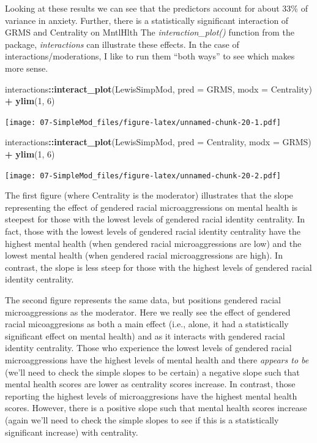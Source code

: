 \documentclass[
  11pt,
]{book}
\newenvironment{Shaded}{\begin{snugshade}}{\end{snugshade}}
\newcommand{\AttributeTok}[1]{\textcolor[rgb]{0.27,0.27,0.27}{#1}}
\newcommand{\DecValTok}[1]{\textcolor[rgb]{0.06,0.06,0.06}{#1}}
\newcommand{\FunctionTok}[1]{\textcolor[rgb]{0.27,0.27,0.27}{\textbf{#1}}}
\newcommand{\NormalTok}[1]{#1}
\newcommand{\SpecialCharTok}[1]{\textcolor[rgb]{0.43,0.43,0.43}{\textbf{#1}}}
\begin{document}
Looking at these results we can see that the predictors account for about 33\% of variance in anxiety. Further, there is a statistically significant interaction of GRMS and Centrality on MntlHlth The \emph{interaction\_plot()} function from the package, \emph{interactions} can illustrate these effects. In the case of interactions/moderations, I like to run them ``both ways'' to see which makes more sense.

\begin{Shaded}
\begin{Highlighting}[]
\NormalTok{interactions}\SpecialCharTok{::}\FunctionTok{interact\_plot}\NormalTok{(LewisSimpMod, }\AttributeTok{pred =}\NormalTok{ GRMS, }\AttributeTok{modx =}\NormalTok{ Centrality) }\SpecialCharTok{+}
    \FunctionTok{ylim}\NormalTok{(}\DecValTok{1}\NormalTok{, }\DecValTok{6}\NormalTok{)}
\end{Highlighting}
\end{Shaded}

\texttt{[image: 07-SimpleMod\_files/figure-latex/unnamed-chunk-20-1.pdf]}

\begin{Shaded}
\begin{Highlighting}[]
\NormalTok{interactions}\SpecialCharTok{::}\FunctionTok{interact\_plot}\NormalTok{(LewisSimpMod, }\AttributeTok{pred =}\NormalTok{ Centrality, }\AttributeTok{modx =}\NormalTok{ GRMS) }\SpecialCharTok{+}
    \FunctionTok{ylim}\NormalTok{(}\DecValTok{1}\NormalTok{, }\DecValTok{6}\NormalTok{)}
\end{Highlighting}
\end{Shaded}

\texttt{[image: 07-SimpleMod\_files/figure-latex/unnamed-chunk-20-2.pdf]}

The first figure (where Centrality is the moderator) illustrates that the slope representing the effect of gendered racial microaggressions on mental health is steepest for those with the lowest levels of gendered racial identity centrality. In fact, those with the lowest levels of gendered racial identity centrality have the highest mental health (when gendered racial microaggressions are low) and the lowest mental health (when gendered racial microaggressions are high). In contrast, the slope is less steep for those with the highest levels of gendered racial identity centrality.

The second figure represents the same data, but positions gendered racial microaggressions as the moderator. Here we really see the effect of gendered racial micoaggresions as both a main effect (i.e., alone, it had a statistically significant effect on mental health) and as it interacts with gendered racial identity centrality. Those who experience the lowest levels of gendered racial microaggressions have the highest levels of mental health and there \emph{appears to be} (we'll need to check the simple slopes to be certain) a negative slope such that mental health scores are lower as centrality scores increase. In contrast, those reporting the highest levels of microaggresions have the highest mental health scores. However, there is a positive slope such that mental health scores increase (again we'll need to check the simple slopes to see if this is a statistically significant increase) with centrality.
\end{document}
